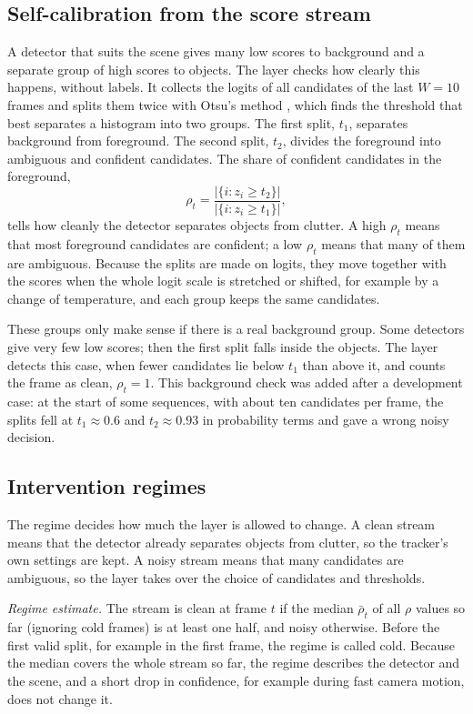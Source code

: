 \documentclass[pdflatex,sn-mathphys-num,iicol]{sn-jnl}
\begin{document}
\subsection{Self-calibration from the score stream}\label{sec:calib}
A detector that suits the scene gives many low scores to background and a
separate group of high scores to objects. The layer checks how clearly this
happens, without labels. It collects the logits of all candidates of the
last $W=10$ frames and splits them twice with Otsu's method \cite{otsu1979},
which finds the threshold that best separates a histogram into two groups.
The first split, $t_1$, separates background from foreground. The second
split, $t_2$, divides the foreground into ambiguous and confident
candidates. The share of confident candidates in the foreground,
\begin{equation}
\rho_t=\frac{\left|\{i: z_i\ge t_2\}\right|}{\left|\{i: z_i\ge t_1\}\right|},
\label{eq:rho}
\end{equation}
tells how cleanly the detector separates objects from clutter. A high
$\rho_t$ means that most foreground candidates are confident; a low
$\rho_t$ means that many of them are ambiguous. Because the splits are
made on logits, they move together with the scores when the whole logit
scale is stretched or shifted, for example by a change of temperature, and
each group keeps the same candidates.

These groups only make sense if there is a real background group. Some
detectors give very few low scores; then the first split falls inside the
objects. The layer detects this case, when fewer candidates lie below $t_1$
than above it, and counts the frame as clean, $\rho_t=1$. This background
check was added after a development case: at the start of some sequences,
with about ten candidates per frame, the splits fell at $t_1\approx0.6$ and
$t_2\approx0.93$ in probability terms and gave a wrong noisy decision.

\subsection{Intervention regimes}\label{sec:regimes}
The regime decides how much the layer is allowed to change. A clean stream
means that the detector already separates objects from clutter, so the
tracker's own settings are kept. A noisy stream means that many candidates
are ambiguous, so the layer takes over the choice of candidates and
thresholds.

\emph{Regime estimate.} The stream is clean at frame $t$ if the median
$\bar\rho_t$ of all $\rho$ values so far (ignoring cold frames) is at
least one half, and noisy otherwise. Before the first valid split, for
example in the first frame, the regime is called cold. Because the median
covers the whole stream so far, the regime describes the detector and the
scene, and a short drop in confidence, for example during fast camera
motion, does not change it.
\end{document}
